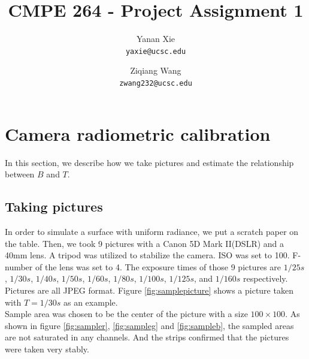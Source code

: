 \documentclass[10pt,twocolumn,letterpaper]{article}
\begin{document}
\title{CMPE 264 - Project Assignment 1}

\author{Yanan Xie\\
{\tt\small yaxie@ucsc.edu}
\and
Ziqiang Wang\\
{\tt\small zwang232@ucsc.edu}
}

\maketitle


\section{Camera radiometric calibration}
\label{sec:crc}

In this section, we describe how we take pictures and estimate the relationship between $B$ and $T$.

\subsection{Taking pictures}

In order to simulate a surface with uniform radiance, we put a scratch paper on the table. Then, we took 9 pictures with a Canon 5D Mark II(DSLR) and a 40mm lens. A tripod was utilized to stabilize the camera. ISO was set to 100. F-number of the lens was set to 4. The exposure times of those 9 pictures are $1/25s$, $1/30s$, $1/40s$, $1/50s$, $1/60s$, $1/80s$, $1/100s$, $1/125s$, and $1/160s$ respectively. Pictures are all JPEG format. Figure \ref{fig:samplepicture} shows a picture taken with $T = 1/30s$ as an example. \\

Sample area was chosen to be the center of the picture with a size $100\times 100$. As shown in figure \ref{fig:sampler}, \ref{fig:sampleg} and \ref{fig:sampleb}, the sampled areas are not saturated in any channels. And the strips confirmed that the pictures were taken very stably.
\end{document}
